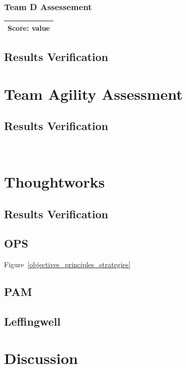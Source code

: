 \subsubsection{Team D Assessement}
\begin{tabular}{| p{3cm} | }
\hline
\textbf{Score:} value \\ \hline
\end{tabular}

\subsection{Results Verification}



\section{Team Agility Assessment}
\subsection{Results Verification}
~

\section{Thoughtworks}
\subsection{Results Verification}





\subsection{OPS}
Figure~\ref{objectives_principles_strategies}
\subsection{PAM}
\subsection{Leffingwell}
\section{Discussion}
